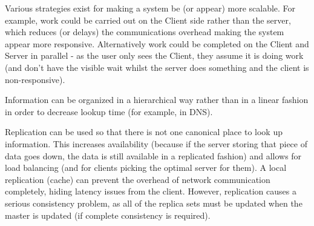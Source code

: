 \documentclass{article}
\begin{document}
Various strategies exist for making a system be (or appear) more scalable. For example, work could be carried out on the Client side rather than the server, which reduces (or delays) the communications overhead making the system appear more responsive. Alternatively work could be completed on the Client and Server in parallel - as the user only sees the Client, they assume it is doing work (and don't have the visible wait whilst the server does something and the client is non-responsive).

Information can be organized in a hierarchical way rather than in a linear fashion in order to decrease lookup time (for example, in DNS).

Replication can be used so that there is not one canonical place to look up information. This increases availability (because if the server storing that piece of data goes down, the data is still available in a replicated fashion) and allows for load balancing (and for clients picking the optimal server for them). A local replication (cache) can prevent the overhead of network communication completely, hiding latency issues from the client. However, replication causes a serious consistency problem, as all of the replica sets must be updated when the master is updated (if complete consistency is required).
\end{document}
